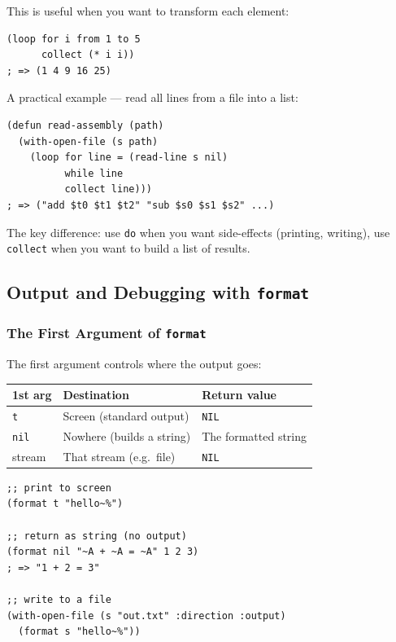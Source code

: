 This is useful when you want to transform each element:

\begin{lstlisting}
(loop for i from 1 to 5
      collect (* i i))
; => (1 4 9 16 25)
\end{lstlisting}

A practical example --- read all lines from a file into a list:

\begin{lstlisting}
(defun read-assembly (path)
  (with-open-file (s path)
    (loop for line = (read-line s nil)
          while line
          collect line)))
; => ("add $t0 $t1 $t2" "sub $s0 $s1 $s2" ...)
\end{lstlisting}

The key difference: use \texttt{do} when you want side-effects
(printing, writing), use \texttt{collect} when you want to build
a list of results.

\subsection{Output and Debugging with \texttt{format}}

\subsubsection{The First Argument of \texttt{format}}

The first argument controls where the output goes:

\begin{center}
\begin{tabular}{llp{5cm}}
  \toprule
  \textbf{1st arg} & \textbf{Destination} & \textbf{Return value} \\
  \midrule
  \texttt{t}      & Screen (standard output) & \texttt{NIL} \\
  \texttt{nil}    & Nowhere (builds a string) & The formatted string \\
  stream          & That stream (e.g.\ file)  & \texttt{NIL} \\
  \bottomrule
\end{tabular}
\end{center}

\begin{lstlisting}
;; print to screen
(format t "hello~%")

;; return as string (no output)
(format nil "~A + ~A = ~A" 1 2 3)
; => "1 + 2 = 3"

;; write to a file
(with-open-file (s "out.txt" :direction :output)
  (format s "hello~%"))
\end{lstlisting}

